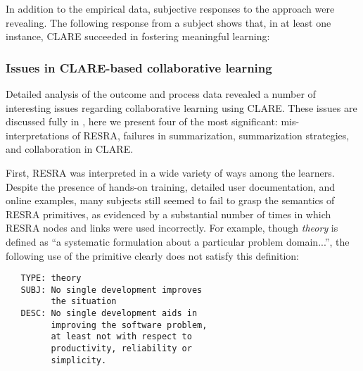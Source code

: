 In addition to the empirical data, subjective responses to the approach
were revealing.  The following response from a subject shows that, in at
least one instance, CLARE succeeded in fostering meaningful learning:

\begin{quotation}
\end{quotation}


\subsubsection{Issues in CLARE-based collaborative learning}

Detailed analysis of the outcome and process data revealed a number of
interesting issues regarding collaborative learning using CLARE.  These
issues are discussed fully in \cite{csdl-93-14}, here we present four of
the most significant: mis-interpretations of RESRA, failures in
summarization, summarization strategies, and collaboration in CLARE.

First, RESRA was interpreted in a wide variety of ways among the learners.
Despite the presence of hands-on training, detailed user documentation, and
online examples, many subjects still seemed to fail to grasp the semantics
of RESRA primitives, as evidenced by a substantial number of times in which
RESRA nodes and links were used incorrectly.  For example, though {\em
theory\/} is defined as ``a systematic formulation about a particular
problem domain...'', the following use of the primitive clearly does not
satisfy this definition:

\begin{verbatim}
   TYPE: theory
   SUBJ: No single development improves
         the situation
   DESC: No single development aids in
         improving the software problem,
         at least not with respect to
         productivity, reliability or
         simplicity.
\end{verbatim}

